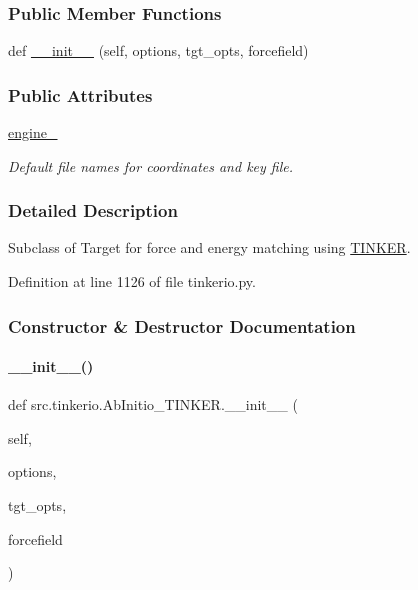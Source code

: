 \subsubsection*{Public Member Functions}
\begin{DoxyCompactItemize}
\item 
def \hyperlink{classsrc_1_1tinkerio_1_1AbInitio__TINKER_a1bc9723a844cef97a7508c9a2959f60f}{\+\_\+\+\_\+init\+\_\+\+\_\+} (self, options, tgt\+\_\+opts, forcefield)
\end{DoxyCompactItemize}
\subsubsection*{Public Attributes}
\begin{DoxyCompactItemize}
\item 
\hyperlink{classsrc_1_1tinkerio_1_1AbInitio__TINKER_a24062e5d574569368efd4e9f020d0d03}{engine\+\_\+}
\begin{DoxyCompactList}\small\item\em Default file names for coordinates and key file. \end{DoxyCompactList}\end{DoxyCompactItemize}


\subsubsection{Detailed Description}
Subclass of Target for force and energy matching using \hyperlink{classsrc_1_1tinkerio_1_1TINKER}{T\+I\+N\+K\+ER}. 



Definition at line 1126 of file tinkerio.\+py.



\subsubsection{Constructor \& Destructor Documentation}
\mbox{\label{classsrc_1_1tinkerio_1_1AbInitio__TINKER_a1bc9723a844cef97a7508c9a2959f60f}} 
\paragraph{\texorpdfstring{\+\_\+\+\_\+init\+\_\+\+\_\+()}{\_\_init\_\_()}}
{\footnotesize\ttfamily def src.\+tinkerio.\+Ab\+Initio\+\_\+\+T\+I\+N\+K\+E\+R.\+\_\+\+\_\+init\+\_\+\+\_\+ (\begin{DoxyParamCaption}\item[{}]{self,  }\item[{}]{options,  }\item[{}]{tgt\+\_\+opts,  }\item[{}]{forcefield }\end{DoxyParamCaption})}



